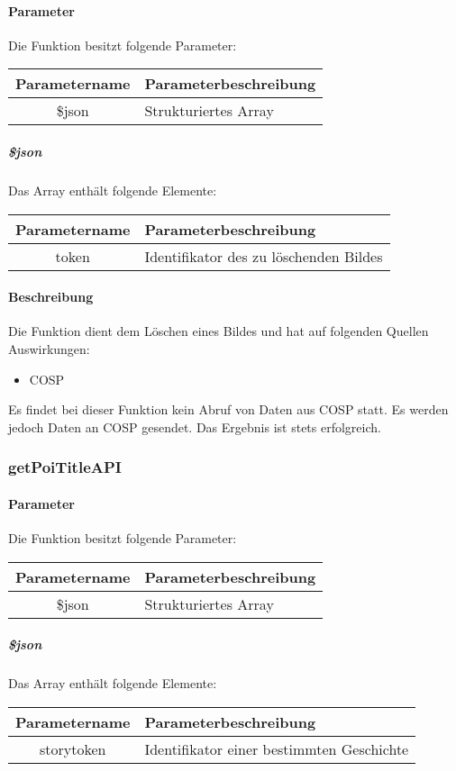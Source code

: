 \paragraph{Parameter} Die Funktion besitzt folgende Parameter:
\begin{table}[H]
	\begin{tabular}{|c|p{11cm}|}
		\hline
		\textbf{Parametername} & \textbf{Parameterbeschreibung} \\ \hline
		\$json & Strukturiertes Array \\ \hline
	\end{tabular}
\end{table}
\subparagraph{\$json}Das Array enthält folgende Elemente:
\begin{table}[H]
	\begin{tabular}{|c|p{11cm}|}
		\hline
		\textbf{Parametername} & \textbf{Parameterbeschreibung} \\ \hline
		token & Identifikator des zu löschenden Bildes \\ \hline
	\end{tabular}
\end{table}
\paragraph{Beschreibung} Die Funktion dient dem Löschen eines Bildes und hat auf folgenden Quellen Auswirkungen:
\begin{itemize}
	\item COSP
\end{itemize}
Es findet bei dieser Funktion kein Abruf von Daten aus {\glqq COSP\grqq} statt. Es werden jedoch Daten an {\glqq COSP\grqq} gesendet. Das Ergebnis ist stets erfolgreich.
\subsubsection{getPoiTitleAPI}
\paragraph{Parameter} Die Funktion besitzt folgende Parameter:
\begin{table}[H]
	\begin{tabular}{|c|p{11cm}|}
		\hline
		\textbf{Parametername} & \textbf{Parameterbeschreibung} \\ \hline
		\$json & Strukturiertes Array \\ \hline
	\end{tabular}
\end{table}
\subparagraph{\$json}Das Array enthält folgende Elemente:
\begin{table}[H]
	\begin{tabular}{|c|p{11cm}|}
		\hline
		\textbf{Parametername} & \textbf{Parameterbeschreibung} \\ \hline
		storytoken & Identifikator einer bestimmten Geschichte \\ \hline
	\end{tabular}
\end{table}
